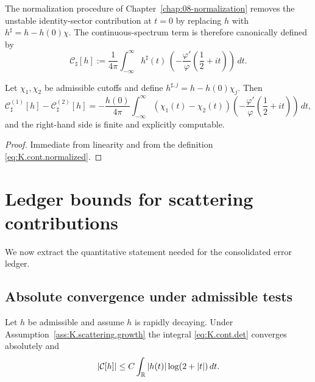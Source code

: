 The normalization procedure of Chapter~\ref{chap:08-normalization} removes the unstable identity-sector contribution
at $t=0$ by replacing $h$ with $h^\sharp=h-h(0)\chi$.
The continuous-spectrum term is therefore canonically defined by
\begin{equation}\label{eq:K.cont.normalized}
\mathcal{C}_\sharp[h]
:=
\frac{1}{4\pi}
\int_{-\infty}^{\infty}
h^\sharp(t)\,
\left(
-\frac{\varphi'}{\varphi}\!\left(\frac12+it\right)
\right)\,dt.
\end{equation}

\begin{lemma}
\label{lem:K.cutoff.stability}
Let $\chi_1,\chi_2$ be admissible cutoffs and define $h^{\sharp,j}=h-h(0)\chi_j$.
Then
\begin{equation}\label{eq:K.cutoff.diff}
\mathcal{C}_{\sharp}^{(1)}[h]-\mathcal{C}_{\sharp}^{(2)}[h]
=
-\frac{h(0)}{4\pi}
\int_{-\infty}^{\infty}
(\chi_1(t)-\chi_2(t))
\left(
-\frac{\varphi'}{\varphi}\!\left(\frac12+it\right)
\right)\,dt,
\end{equation}
and the right-hand side is finite and explicitly computable.
\end{lemma}

\begin{proof}
Immediate from linearity and from the definition \eqref{eq:K.cont.normalized}.
\end{proof}

\section{Ledger bounds for scattering contributions}
\label{sec:K.ledger}

We now extract the quantitative statement needed for the consolidated error ledger.

\subsection{Absolute convergence under admissible tests}
\label{subsec:K.abs.conv}

\begin{lemma}
\label{lem:K.abs.conv}
Let $h$ be admissible and assume $h$ is rapidly decaying.
Under Assumption~\ref{ass:K.scattering.growth} the integral \eqref{eq:K.cont.det} converges absolutely and
\begin{equation}\label{eq:K.abs.conv.bound}
|\mathcal{C}[h]|
\le
C
\int_{\mathbb{R}} |h(t)|\log(2+|t|)\,dt.
\end{equation}
\end{lemma}

